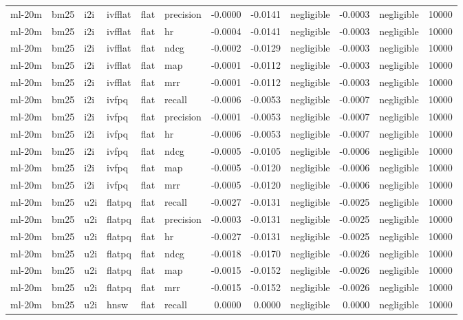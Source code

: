 \begin{tabular}{llllllrrlrlr}
ml-20m & bm25 & i2i & ivfflat & flat & precision & -0.0000 & -0.0141 & negligible & -0.0003 & negligible & 10000 \\
ml-20m & bm25 & i2i & ivfflat & flat & hr & -0.0004 & -0.0141 & negligible & -0.0003 & negligible & 10000 \\
ml-20m & bm25 & i2i & ivfflat & flat & ndcg & -0.0002 & -0.0129 & negligible & -0.0003 & negligible & 10000 \\
ml-20m & bm25 & i2i & ivfflat & flat & map & -0.0001 & -0.0112 & negligible & -0.0003 & negligible & 10000 \\
ml-20m & bm25 & i2i & ivfflat & flat & mrr & -0.0001 & -0.0112 & negligible & -0.0003 & negligible & 10000 \\
ml-20m & bm25 & i2i & ivfpq & flat & recall & -0.0006 & -0.0053 & negligible & -0.0007 & negligible & 10000 \\
ml-20m & bm25 & i2i & ivfpq & flat & precision & -0.0001 & -0.0053 & negligible & -0.0007 & negligible & 10000 \\
ml-20m & bm25 & i2i & ivfpq & flat & hr & -0.0006 & -0.0053 & negligible & -0.0007 & negligible & 10000 \\
ml-20m & bm25 & i2i & ivfpq & flat & ndcg & -0.0005 & -0.0105 & negligible & -0.0006 & negligible & 10000 \\
ml-20m & bm25 & i2i & ivfpq & flat & map & -0.0005 & -0.0120 & negligible & -0.0006 & negligible & 10000 \\
ml-20m & bm25 & i2i & ivfpq & flat & mrr & -0.0005 & -0.0120 & negligible & -0.0006 & negligible & 10000 \\
ml-20m & bm25 & u2i & flatpq & flat & recall & -0.0027 & -0.0131 & negligible & -0.0025 & negligible & 10000 \\
ml-20m & bm25 & u2i & flatpq & flat & precision & -0.0003 & -0.0131 & negligible & -0.0025 & negligible & 10000 \\
ml-20m & bm25 & u2i & flatpq & flat & hr & -0.0027 & -0.0131 & negligible & -0.0025 & negligible & 10000 \\
ml-20m & bm25 & u2i & flatpq & flat & ndcg & -0.0018 & -0.0170 & negligible & -0.0026 & negligible & 10000 \\
ml-20m & bm25 & u2i & flatpq & flat & map & -0.0015 & -0.0152 & negligible & -0.0026 & negligible & 10000 \\
ml-20m & bm25 & u2i & flatpq & flat & mrr & -0.0015 & -0.0152 & negligible & -0.0026 & negligible & 10000 \\
ml-20m & bm25 & u2i & hnsw & flat & recall & 0.0000 & 0.0000 & negligible & 0.0000 & negligible & 10000 \\

\end{tabular}
